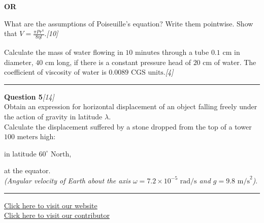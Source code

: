 \documentclass[11pt,a4paper]{article}
\newcommand{\pts}[1]{\hfill\textit{[#1]}}
\begin{document}
\begin{center}\textbf{OR}\end{center}

\begin{parts}
  \item What are the assumptions of Poiseuille's equation? Write them pointwise. Show that $V = \frac{\pi P r^4}{8 \eta l}$.\pts{10}
  \item Calculate the mass of water flowing in $10\text{ minutes}$ through a tube $0.1\text{ cm}$ in diameter, $40\text{ cm}$ long, if there is a constant pressure head of $20\text{ cm}$ of water. The coefficient of viscosity of water is $0.0089\text{ CGS units}$.\pts{4}
\end{parts}

\medskip\rule{\linewidth}{0.2pt}\medskip

\noindent\textbf{Question 5}\pts{14} \\
Obtain an expression for horizontal displacement of an object falling freely under the action of gravity in latitude $\lambda$.\\
Calculate the displacement suffered by a stone dropped from the top of a tower $100\text{ meters}$ high:
\begin{parts}[label=(\roman*)]
  \item in latitude $60^\circ\text{ North}$,
  \item at the equator.\\
  \textit{(Angular velocity of Earth about the axis $\omega = 7.2 \times 10^{-5}\text{ rad/s}$ and $g = 9.8\text{ m/s}^2$)}.
\end{parts}

\vfill\rule{\linewidth}{0.4pt}
\begin{center}\small
\href{https://bhu-exam.vercel.app/}{Click here to visit our website}\\[4pt]
\href{https://me-aryan.vercel.app/}{Click here to visit our contributor}
\end{center}
\end{document}
